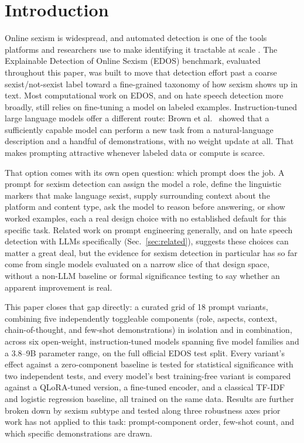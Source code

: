 \section{Introduction}
\label{sec:introduction}

Online sexism is widespread, and automated detection is one of the
tools platforms and researchers use to make identifying it tractable at
scale \cite{kirk2023semeval}. The Explainable Detection of Online
Sexism (EDOS) benchmark, evaluated throughout this paper, was built to
move that detection effort past a coarse sexist/not-sexist label toward
a fine-grained taxonomy of how sexism shows up in text. Most
computational work on EDOS, and on hate speech detection more broadly,
still relies on fine-tuning a model on labeled examples.
Instruction-tuned large language models offer a different route: Brown
et al.~\cite{brown2020gpt3} showed that a sufficiently capable model
can perform a new task from a natural-language description and a
handful of demonstrations, with no weight update at all. That makes
prompting attractive whenever labeled data or compute is scarce.

That option comes with its own open question: which prompt does the
job. A prompt for sexism detection can assign the model a role, define
the linguistic markers that make language sexist, supply surrounding
context about the platform and content type, ask the model to reason
before answering, or show worked examples, each a real design choice
with no established default for this specific task. Related work on
prompt engineering generally, and on hate speech detection with LLMs
specifically (Sec.~\ref{sec:related}), suggests these choices can matter
a great deal, but the evidence for sexism detection in particular has so
far come from single models evaluated on a narrow slice of that design
space, without a non-LLM baseline or formal significance testing to say
whether an apparent improvement is real.

This paper closes that gap directly: a curated grid of 18 prompt
variants, combining five independently toggleable components (role,
aspects, context, chain-of-thought, and few-shot demonstrations) in
isolation and in combination, across six open-weight, instruction-tuned
models spanning five model families and a 3.8--9B parameter range, on
the full official EDOS test split. Every variant's effect against a
zero-component baseline is tested for statistical significance with two
independent tests, and every model's best training-free variant is
compared against a QLoRA-tuned version, a fine-tuned encoder, and a
classical TF-IDF and logistic regression baseline, all trained on the
same data. Results are further broken down by sexism subtype and tested
along three robustness axes prior work has not applied to this task:
prompt-component order, few-shot count, and which specific
demonstrations are drawn.

